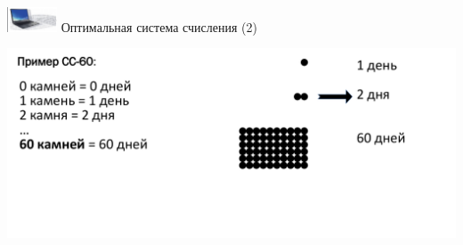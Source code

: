\documentclass{beamer}
\begin{document}
\begin{frame}{\includegraphics[width=4em]{picture_logo.png} Оптимальная система счисления (2)}
\begin{center}
    \includegraphics[width=\columnwidth]{34.png}
\end{center}
\end{frame}
\end{document}
